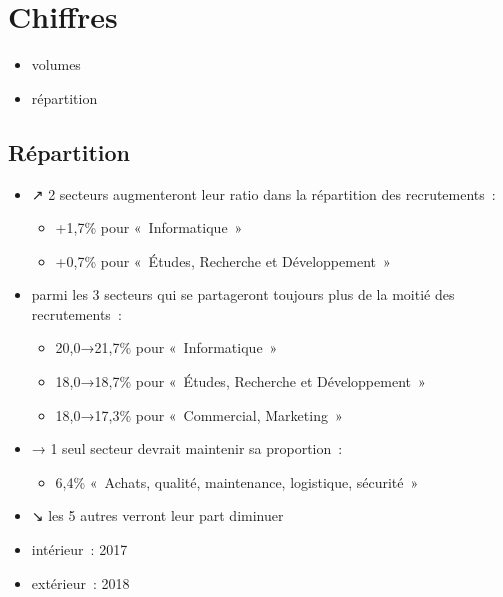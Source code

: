 \documentclass[20pt]{extarticle}
\begin{document}
\section{Chiffres}
\begin{itemize}
\item{volumes}
\item{répartition}
\end{itemize}
\pagebreak
\subsection{Répartition}
\begin{itemize}
\item{↗ 2 secteurs augmenteront leur ratio\newline
dans la répartition des recrutements :
    \begin{itemize}
    \item{+1,7\% pour « Informatique »}
    \item{+0,7\% pour « Études, Recherche et Développement »}
    \end{itemize}}
\item{parmi les 3 secteurs qui se partageront\newline
toujours plus de la moitié des recrutements :
    \begin{itemize}
    \item{20,0→21,7\% pour « Informatique »}
    \item{18,0→18,7\% pour « Études, Recherche et Développement »}
    \item{18,0→17,3\% pour « Commercial, Marketing »}
    \end{itemize}}
\item{→ 1 seul secteur devrait maintenir sa proportion :
    \begin{itemize}
    \item{6,4\% « Achats, qualité, maintenance, logistique, sécurité »}
    \end{itemize}}
\item{↘ les 5 autres verront leur part diminuer}
\end{itemize}
\pagebreak
\begin{itemize}
\item{intérieur : 2017}
\item{extérieur : 2018}
\end{itemize}
\pagebreak
\end{document}

